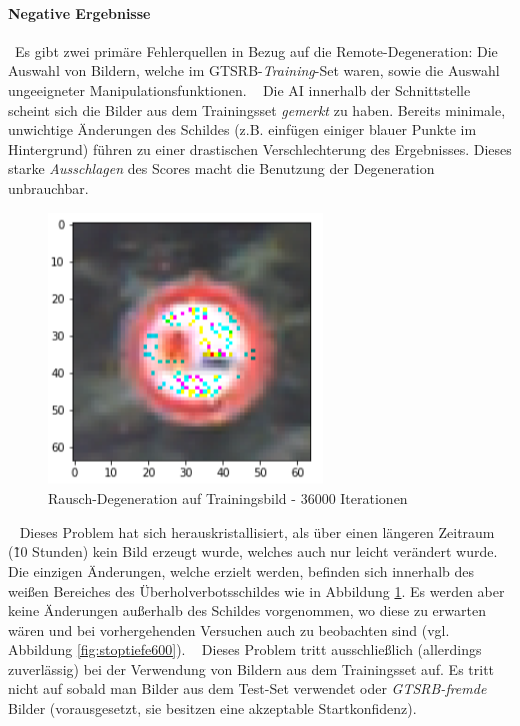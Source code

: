 \paragraph{Negative Ergebnisse} ~\newline Es gibt zwei primäre Fehlerquellen in Bezug auf die Remote-Degeneration: Die Auswahl von Bildern, welche im GTSRB-\textit{Training}-Set waren, sowie die Auswahl ungeeigneter Manipulationsfunktionen. 
~\newline
Die AI innerhalb der Schnittstelle scheint sich die Bilder aus dem Trainingsset \textit{gemerkt} zu haben. Bereits minimale, unwichtige Änderungen des Schildes (z.B. einfügen einiger blauer Punkte im Hintergrund) führen zu einer drastischen Verschlechterung des Ergebnisses. Dieses starke \textit{Ausschlagen} des Scores macht die Benutzung der Degeneration unbrauchbar.
\begin{figure}[h]
	\centering
	\includegraphics[width=0.5\linewidth]{Images/DegenSamples/OverFitSmaller}
	\caption[Degeneration overfit]{Rausch-Degeneration auf Trainingsbild - 36000 Iterationen}
	\label{fig:DegenOverfit}
\end{figure}
~\newline
Dieses Problem hat sich herauskristallisiert, als über einen längeren Zeitraum (\~ 10 Stunden) kein Bild erzeugt wurde, welches auch nur leicht verändert wurde. Die einzigen Änderungen, welche erzielt werden, befinden sich innerhalb des weißen Bereiches des Überholverbotsschildes wie in Abbildung \ref{fig:DegenOverfit}. Es werden aber keine Änderungen außerhalb des Schildes vorgenommen, wo diese zu erwarten wären und bei vorhergehenden Versuchen auch zu beobachten sind (vgl. Abbildung \ref{fig:stoptiefe600}). 
~\newline
Dieses Problem tritt ausschließlich (allerdings zuverlässig) bei der Verwendung von Bildern aus dem Trainingsset auf. Es tritt nicht auf sobald man Bilder aus dem Test-Set verwendet oder \textit{GTSRB-fremde} Bilder (vorausgesetzt, sie besitzen eine akzeptable Startkonfidenz). 


